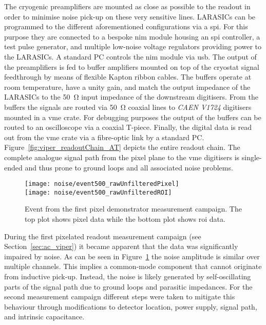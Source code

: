 The cryogenic preamplifiers are mounted as close as possible to the readout in order to minimise noise pick-up on these very sensitive lines.
LARASICs can be programmed to the different aforementioned configurations via a \gls{spi}.
For this purpose they are connected to a bespoke \gls{nim} module housing an \gls{spi} controller, a test pulse generator, and multiple low-noise voltage regulators providing power to the LARASICs.
A standard PC controls the \gls{nim} module via \gls{usb}.
The output of the preamplifiers is fed to buffer amplifiers mounted on top of the cryostat signal feedthrough by means of flexible Kapton ribbon cables.
The buffers operate at room temperature, have a unity gain, and match the output impedance of the LARASICs to the \SI{50}{\ohm} input impedance of the downstream digitisers.
From the buffers the signals are routed via \SI{50}{\ohm} coaxial lines to \emph{CAEN V1724} digitisers~\cite{caen_adc} mounted in a \gls{vme} crate.
For debugging purposes the output of the buffers can be routed to an oscilloscope via a coaxial T-piece.
Finally, the digital data is read out from the \gls{vme} crate via a fibre-optic link by a standard PC.
Figure~\ref{fig:viper_readoutChain_AT} depicts the entire readout chain.
The complete analogue signal path from the pixel plane to the \gls{vme} digitisers is single-ended and thus prone to ground loops and all associated noise problems.

\begin{figure}[htb]
	\centering
	\texttt{[image: noise/event500\_rawUnfilteredPixel]}\\
	\texttt{[image: noise/event500\_rawUnfilteredROI]}
	\caption[Event from first pixel demonstrator measurement campaign]{%
		Event from the first pixel demonstrator measurement campaign.
		The top plot shows pixel data while the bottom plot shows \acrshort{roi} data.
	}
	\label{fig:electronics_event-run1}
\end{figure}

During the first pixelated readout measurement campaign (see Section~\ref{sec:ac_viper}) it became apparent that the data was significantly impaired by noise.
As can be seen in Figure~\ref{fig:electronics_event-run1} the noise amplitude is similar over multiple channels.
This implies a common-mode component that cannot originate from inductive pick-up.
Instead, the noise is likely generated by self-oscillating parts of the signal path due to ground loops and parasitic impedances.
For the second measurement campaign different steps were taken to mitigate this behaviour through modifications to detector location, power supply, signal path, and intrinsic capacitance.

